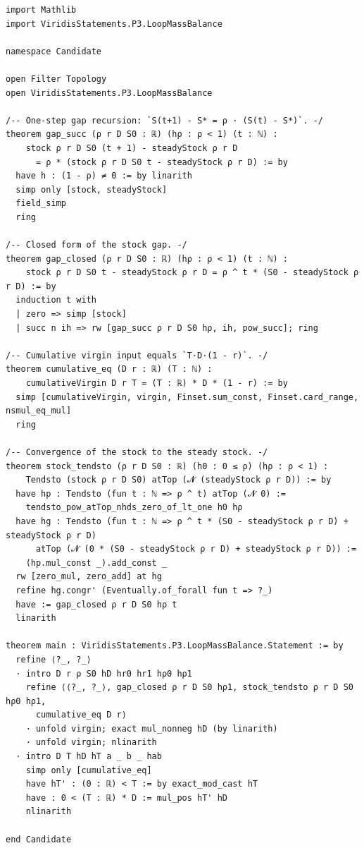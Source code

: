 \documentclass[11pt]{article}
\theoremstyle{definition}
\theoremstyle{remark}
\begin{document}
\begin{lstlisting}[caption={The complete candidate proof \texttt{proofs/P3.LoopMassBalance.lean}.}]
import Mathlib
import ViridisStatements.P3.LoopMassBalance

namespace Candidate

open Filter Topology
open ViridisStatements.P3.LoopMassBalance

/-- One-step gap recursion: `S(t+1) - S* = ρ · (S(t) - S*)`. -/
theorem gap_succ (ρ r D S0 : ℝ) (hρ : ρ < 1) (t : ℕ) :
    stock ρ r D S0 (t + 1) - steadyStock ρ r D
      = ρ * (stock ρ r D S0 t - steadyStock ρ r D) := by
  have h : (1 - ρ) ≠ 0 := by linarith
  simp only [stock, steadyStock]
  field_simp
  ring

/-- Closed form of the stock gap. -/
theorem gap_closed (ρ r D S0 : ℝ) (hρ : ρ < 1) (t : ℕ) :
    stock ρ r D S0 t - steadyStock ρ r D = ρ ^ t * (S0 - steadyStock ρ r D) := by
  induction t with
  | zero => simp [stock]
  | succ n ih => rw [gap_succ ρ r D S0 hρ, ih, pow_succ]; ring

/-- Cumulative virgin input equals `T·D·(1 - r)`. -/
theorem cumulative_eq (D r : ℝ) (T : ℕ) :
    cumulativeVirgin D r T = (T : ℝ) * D * (1 - r) := by
  simp [cumulativeVirgin, virgin, Finset.sum_const, Finset.card_range, nsmul_eq_mul]
  ring

/-- Convergence of the stock to the steady stock. -/
theorem stock_tendsto (ρ r D S0 : ℝ) (h0 : 0 ≤ ρ) (hρ : ρ < 1) :
    Tendsto (stock ρ r D S0) atTop (𝓝 (steadyStock ρ r D)) := by
  have hp : Tendsto (fun t : ℕ => ρ ^ t) atTop (𝓝 0) :=
    tendsto_pow_atTop_nhds_zero_of_lt_one h0 hρ
  have hg : Tendsto (fun t : ℕ => ρ ^ t * (S0 - steadyStock ρ r D) + steadyStock ρ r D)
      atTop (𝓝 (0 * (S0 - steadyStock ρ r D) + steadyStock ρ r D)) :=
    (hp.mul_const _).add_const _
  rw [zero_mul, zero_add] at hg
  refine hg.congr' (Eventually.of_forall fun t => ?_)
  have := gap_closed ρ r D S0 hρ t
  linarith

theorem main : ViridisStatements.P3.LoopMassBalance.Statement := by
  refine ⟨?_, ?_⟩
  · intro D r ρ S0 hD hr0 hr1 hρ0 hρ1
    refine ⟨⟨?_, ?_⟩, gap_closed ρ r D S0 hρ1, stock_tendsto ρ r D S0 hρ0 hρ1,
      cumulative_eq D r⟩
    · unfold virgin; exact mul_nonneg hD (by linarith)
    · unfold virgin; nlinarith
  · intro D T hD hT a _ b _ hab
    simp only [cumulative_eq]
    have hT' : (0 : ℝ) < T := by exact_mod_cast hT
    have : 0 < (T : ℝ) * D := mul_pos hT' hD
    nlinarith

end Candidate
\end{lstlisting}
\end{document}
